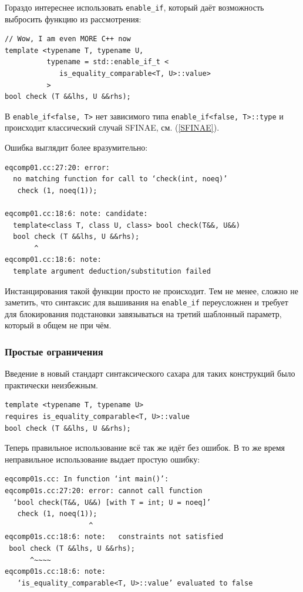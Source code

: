 \documentclass[a4paper,12pt,oneside]{article}
\begin{document}
Гораздо интереснее использовать \lstinline!enable_if!, который даёт возможность выбросить функцию из рассмотрения:

\begin{lstlisting}
// Wow, I am even MORE C++ now
template <typename T, typename U,
          typename = std::enable_if_t <
             is_equality_comparable<T, U>::value>
          >
bool check (T &&lhs, U &&rhs);
\end{lstlisting}

В \lstinline!enable_if<false, T>! нет зависимого типа \lstinline!enable_if<false, T>::type! и происходит классический случай SFINAE, см. (\ref{SFINAE}).

Ошибка выглядит более вразумительно:

\begin{verbatim}
eqcomp01.cc:27:20: error: 
  no matching function for call to ‘check(int, noeq)’
   check (1, noeq(1));

eqcomp01.cc:18:6: note: candidate: 
  template<class T, class U, class> bool check(T&&, U&&)
  bool check (T &&lhs, U &&rhs);
       ^
eqcomp01.cc:18:6: note:   
  template argument deduction/substitution failed
\end{verbatim}

Инстанцирования такой функции просто не происходит. Тем не менее, сложно не заметить, что синтаксис для вышивания на \lstinline!enable_if! переусложнен и требует для блокирования подстановки завязываться на третий шаблонный параметр, который в общем не при чём.

\subsubsection{Простые ограничения}\label{Constraints}

Введение в новый стандарт синтаксического сахара для таких конструкций было практически неизбежным.

\begin{lstlisting}
template <typename T, typename U>
requires is_equality_comparable<T, U>::value
bool check (T &&lhs, U &&rhs);
\end{lstlisting}

Теперь правильное использование всё так же идёт без ошибок. В то же время неправильное использование выдает простую ошибку:

\begin{verbatim}
eqcomp01s.cc: In function ‘int main()’:
eqcomp01s.cc:27:20: error: cannot call function 
  ‘bool check(T&&, U&&) [with T = int; U = noeq]’
   check (1, noeq(1));
                    ^
eqcomp01s.cc:18:6: note:   constraints not satisfied
 bool check (T &&lhs, U &&rhs);
      ^~~~~
eqcomp01s.cc:18:6: note:   
   ‘is_equality_comparable<T, U>::value’ evaluated to false
\end{verbatim}
\end{document}
